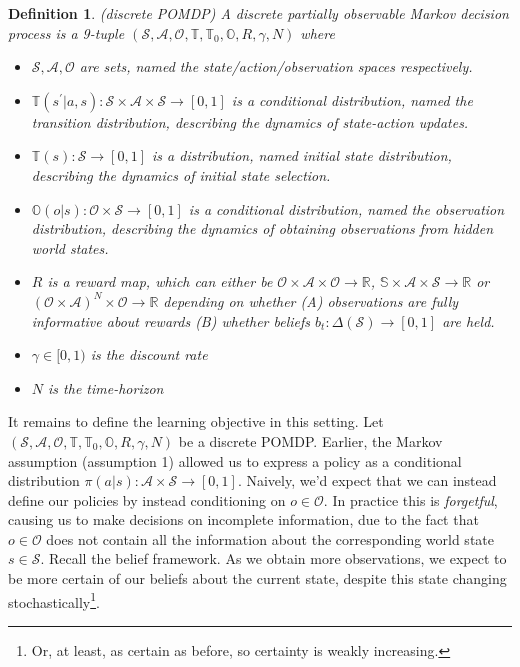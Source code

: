 \documentclass[12pt]{article}
\newtheorem{definition}{Definition}
\begin{document}
\begin{definition}(discrete POMDP)
    A discrete partially observable Markov decision process is a 9-tuple $(\mathcal{S}, \mathcal{A}, \mathcal{O}, \mathbb{T}, 
    \mathbb{T}_0, \mathbb{O}, R, \gamma, N)$ where
    \begin{itemize}
        \item $\mathcal{S}, \mathcal{A}, \mathcal{O}$ are sets, named the state/action/observation spaces respectively. 
        \item $\mathbb{T}(s^\prime | a, s): \mathcal{S} \times \mathcal{A} \times \mathcal{S} \to [0,1]$ is a conditional distribution, 
        named the transition distribution, describing the dynamics of state-action updates. 
        \item $\mathbb{T}(s): \mathcal{S} \to [0,1]$ is a distribution, named initial state distribution, describing the 
        dynamics of initial state selection.  
        \item $\mathbb{O}(o | s): \mathcal{O} \times \mathcal{S} \to [0,1]$ is a conditional distribution, named the observation 
        distribution, describing the dynamics of obtaining observations from hidden world states. 
        \item $R$ is a reward map, which can either be $\mathcal{O} \times \mathcal{A} \times \mathcal{O} \to \mathbb{R}$, 
        $\mathbb{S} \times \mathcal{A} \times \mathcal{S} \to \mathbb{R}$ or $(\mathcal{O} \times \mathcal{A})^N \times \mathcal{O} 
        \to \mathbb{R}$ depending on whether (A) observations are fully informative about rewards (B) whether beliefs $b_t: 
        \Delta(\mathcal{S}) \to [0,1]$ are held. 
        \item $\gamma \in [0,1)$ is the discount rate
        \item $N$ is the time-horizon
    \end{itemize}
\end{definition}

It remains to define the learning objective in this setting. Let $(\mathcal{S}, \mathcal{A}, \mathcal{O}, \mathbb{T}, 
\mathbb{T}_0, \mathbb{O}, R, \gamma, N)$ be a discrete POMDP. Earlier, the Markov assumption (assumption 1) allowed us to 
express a policy as a conditional distribution $\pi(a | s): \mathcal{A} \times \mathcal{S} \to [0,1]$. Naively, we'd expect 
that we can instead define our policies by instead conditioning on $o \in \mathcal{O}$. In practice this is \textit{forgetful}, 
causing us to make decisions on incomplete information, due to the fact that $o \in \mathcal{O}$ does not contain all the 
information about the corresponding world state $s \in \mathcal{S}$. Recall the belief framework. As we obtain more observations, 
we expect to be more certain of our beliefs about the current state, despite this state changing stochastically\footnote{
    Or, at least, as certain as before, so certainty is weakly increasing. 
}. \\
\end{document}
